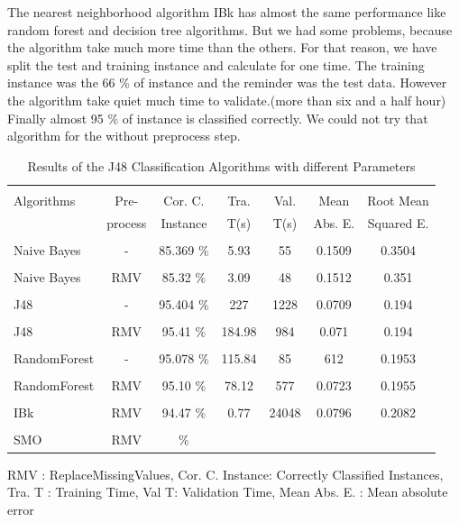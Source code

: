 \documentclass[a4paper]{article}
\begin{document}
The nearest neighborhood algorithm IBk has almost the same performance like
random forest and decision tree algorithms. But we had some problems, because
the algorithm take much more time than the others. For that reason, we have
split the test and training instance and calculate for one time. The training
instance was the  66 $\%$ of instance and the reminder was the test data.
However the algorithm take quiet much time to validate.(more than six and a
half hour) Finally almost 95 $\%$ of instance is classified correctly. We could
not try that algorithm for the without preprocess step.

\begin{table}
\begin{tabular}{|l| c | c | c | c |c |c |}

\hline & & & & & & \\
Algorithms & Pre- & Cor. C.& Tra. & Val. & Mean & Root Mean \\
 & process  & Instance & T(s) &  T(s) &  Abs. E. & Squared E. \\
\hline & & & & & & \\
Naive Bayes		& - &			85.369  $\%$ &  5.93	& 55 &  0.1509  & 0.3504 \\ 
\hline & & & & & & \\
Naive Bayes	 	& RMV &	85.32 $\%$ & 3.09 & 48	 &  0.1512  & 0.351  \\ 
\hline & & & & & & \\
J48	 		& - &			 95.404  $\%$ & 227 & 1228 &  0.0709 & 0.194\\ 
\hline 	& & & & & & \\
J48  			& RMV &			95.41 $\%$ & 184.98 & 984 &  0.071 & 0.194 \\ 
\hline & & & & & & \\
RandomForest  	 & - &			95.078 $\%$ & 115.84 & 85 &  612 & 0.1953 \\ 
\hline & & & & & & \\
RandomForest 	& RMV &			 95.10 $\%$ & 78.12 &  577  & 0.0723 & 0.1955 \\ 
\hline & & & & & & \\
IBk 			& RMV &			94.47 $\%$ & 0.77 &  24048 & 0.0796 & 0.2082\\ 
\hline & & & & & & \\
SMO 			& RMV &			 $\%$ &  &    &   &  \\ 
\hline
\end{tabular}
\caption{Results of the J48 Classification Algorithms with different Parameters}
    RMV : ReplaceMissingValues,
	Cor. C. Instance:  Correctly Classified Instances,
	Tra. T : Training Time,
	Val T: Validation Time,
	Mean Abs. E. : Mean absolute error 
\end{table}
\end{document}
